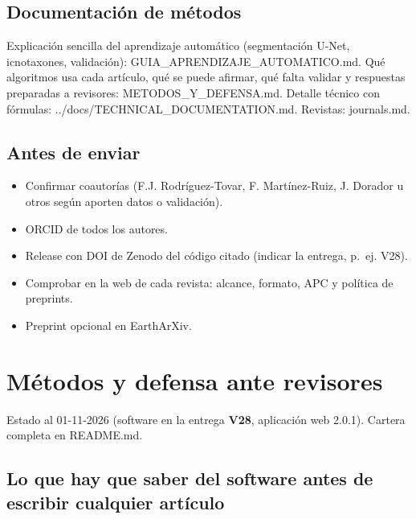 \documentclass[
  10pt,
]{article}
\providecommand{\tightlist}{%
  \setlength{\itemsep}{0pt}\setlength{\parskip}{0pt}}
\begin{document}
\hypertarget{documentaciuxf3n-de-muxe9todos}{%
\subsection{Documentación de
métodos}\label{documentaciuxf3n-de-muxe9todos}}

Explicación sencilla del aprendizaje automático (segmentación U-Net,
icnotaxones, validación): GUIA\_APRENDIZAJE\_AUTOMATICO.md. Qué
algoritmos usa cada artículo, qué se puede afirmar, qué falta validar y
respuestas preparadas a revisores: METODOS\_Y\_DEFENSA.md. Detalle
técnico con fórmulas: ../docs/TECHNICAL\_DOCUMENTATION.md. Revistas:
journals.md.

\hypertarget{antes-de-enviar}{%
\subsection{Antes de enviar}\label{antes-de-enviar}}

\begin{itemize}
\tightlist
\item
  Confirmar coautorías (F.J. Rodríguez-Tovar, F. Martínez-Ruiz, J.
  Dorador u otros según aporten datos o validación).
\item
  ORCID de todos los autores.
\item
  Release con DOI de Zenodo del código citado (indicar la entrega,
  p.~ej. V28).
\item
  Comprobar en la web de cada revista: alcance, formato, APC y política
  de preprints.
\item
  Preprint opcional en EarthArXiv.
\end{itemize}

\newpage

\hypertarget{muxe9todos-y-defensa-ante-revisores}{%
\section{Métodos y defensa ante
revisores}\label{muxe9todos-y-defensa-ante-revisores}}

Estado al 01-11-2026 (software en la entrega \textbf{V28}, aplicación
web 2.0.1). Cartera completa en README.md.

\hypertarget{lo-que-hay-que-saber-del-software-antes-de-escribir-cualquier-artuxedculo}{%
\subsection{Lo que hay que saber del software antes de escribir
cualquier
artículo}\label{lo-que-hay-que-saber-del-software-antes-de-escribir-cualquier-artuxedculo}}
\end{document}
